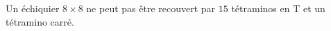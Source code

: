 Un échiquier $8 \times 8$ ne peut pas être recouvert par $15$ tétraminos en T et un tétramino carré.
